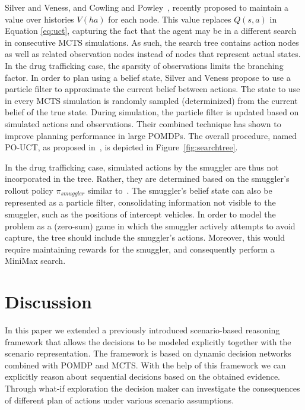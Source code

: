 \documentclass[conference]{IEEEtran}
\begin{document}
Silver and Veness, and Cowling and Powley~\cite{silver2010monte,cowling2012information}, recently proposed to maintain a value over histories $V(ha)$ for each node. This value replaces $Q(s,a)$ in Equation \ref{eq:uct}, capturing the fact that the agent may be in a different search in consecutive MCTS simulations. As such, the search tree contains action nodes as well as related observation nodes instead of nodes that represent actual states. In the drug trafficking case, the sparsity of observations limits the branching factor. In order to plan using a belief state, Silver and Veness propose to use a particle filter to approximate the current belief between actions. The state to use in every MCTS simulation is randomly sampled (\ie determinized) from the current belief of the true state. During simulation, the particle filter is updated based on simulated actions and observations. Their combined technique has shown to improve planning performance in large POMDPs. The overall procedure, named PO-UCT, as proposed in~\cite{silver2010monte}, is depicted in Figure~\ref{fig:searchtree}. 

In the drug trafficking case, simulated actions by the smuggler are thus not incorporated in the tree. Rather, they are determined based on the smuggler's rollout policy $\pi_{smuggler}$ similar to~\cite{realtime2014}. The smuggler's belief state can also be represented as a particle filter, consolidating information not visible to the smuggler, such as the positions of intercept vehicles. In order to model the problem as a (zero-sum) game in which the smuggler actively attempts to avoid capture, the tree should include the smuggler's actions. Moreover, this would require maintaining rewards for the smuggler, and consequently perform a MiniMax search.

\section{Discussion}
\label{sec:discussion}

In this paper we extended a previously introduced scenario-based reasoning framework that allows the decisions to be modeled explicitly together with the scenario representation. The framework is based on dynamic decision networks combined with POMDP and MCTS. With the help of this framework we can explicitly reason about sequential decisions based on the obtained evidence. Through what-if exploration the decision maker can investigate the consequences of different plan of actions under various scenario assumptions. 
\end{document}
